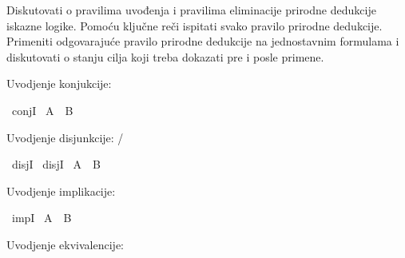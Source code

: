 %
\begin{isabellebody}%
%
%
\isadelimtheory
%
\endisadelimtheory
%
\isatagtheory
%
\endisatagtheory
{\isafoldtheory}%
%
\isadelimtheory
%
\endisadelimtheory
%
\begin{exercise}[subtitle=Intuicionistička pravila prirodne dedukcije iskazne logike.]
%
\begin{isamarkuptext}%
Diskutovati o pravilima uvođenja i pravilima eliminacije prirodne dedukcije iskazne logike.
      Pomoću ključne reči  ispitati svako pravilo prirodne dedukcije. Primeniti 
      odgovarajuće pravilo prirodne dedukcije na jednostavnim formulama i diskutovati o stanju
      cilja koji treba dokazati pre i posle primene.%
\end{isamarkuptext}\isamarkuptrue%
%
\begin{isamarkuptext}%
Uvodjenje konjukcije: %
\end{isamarkuptext}\isamarkuptrue%
\isamarkupfalse%
\ conjI\isanewline
\isanewline
{}\isamarkupfalse%
\ {\isachardoublequoteopen}A\ {\isasymand}\ B{\isachardoublequoteclose}\isanewline
\ \ %
\isadelimproof
%
\endisadelimproof
%
\isatagproof
%
\endisatagproof
{\isafoldproof}%
%
\isadelimproof
%
\endisadelimproof
%
\begin{isamarkuptext}%
Uvodjenje disjunkcije: /%
\end{isamarkuptext}\isamarkuptrue%
\isamarkupfalse%
\ disjI{}\isanewline
{}\isamarkupfalse%
\ disjI{}\isanewline
\isanewline
{}\isamarkupfalse%
\ {\isachardoublequoteopen}A\ {\isasymor}\ B{\isachardoublequoteclose}\isanewline
\ \ %
\isadelimproof
%
\endisadelimproof
%
\isatagproof
%
\endisatagproof
{\isafoldproof}%
%
\isadelimproof
%
\endisadelimproof
%
\begin{isamarkuptext}%
Uvodjenje implikacije: %
\end{isamarkuptext}\isamarkuptrue%
\isamarkupfalse%
\ impI\isanewline
\isanewline
{}\isamarkupfalse%
\ {\isachardoublequoteopen}A\ {\isasymlongrightarrow}\ B{\isachardoublequoteclose}\isanewline
\ \ %
\isadelimproof
%
\endisadelimproof
%
\isatagproof
%
\endisatagproof
{\isafoldproof}%
%
\isadelimproof
%
\endisadelimproof
%
\begin{isamarkuptext}%
Uvodjenje ekvivalencije: %
\end{isamarkuptext}\isamarkuptrue%
\isamarkupfalse%

\end{exercise}
\end{isabellebody}
